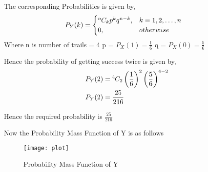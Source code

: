 \documentclass{beamer}
\providecommand{\brak}[1]{\ensuremath{\left(#1\right)}}
\theoremstyle{remark}
\newcommand*{\permcomb}[4][0mu]{{{}^{#3}\mkern#1#2_{#4}}}
\newcommand*{\comb}[1][-1mu]{\permcomb[#1]{C}}
\numberwithin{equation}{subsection}
\begin{document}
\begin{frame}{}
The corresponding Probabilities is given by,
\begin{align}
	P_Y(k) &= \begin{cases} \comb{n}{k} p^k q^{n-k} , & k = 1,2,\dots ,n \\
	0 , & otherwise \end{cases}
\end{align}
Where n is number of trails = 4\newline
p = $P_X(1) = \frac{1}{6}$ \newline
q = $P_X(0) = \frac{5}{6}$ \newline
\end{frame}

\begin{frame}
Hence the probability of getting success twice is given by,
\begin{align}
	P_Y(2) &= \comb{4}{2} \brak{\frac{1}{6}}^2 \brak{\frac{5}{6}}^{4-2} \\
	P_Y(2) &= \frac{25}{216}
\end{align}
\begin{block}{}
Hence the required probability is $\frac{25}{216}$
\end{block}
\end{frame}
\begin{frame}
	Now the Probability Mass Function of Y is as follows
\begin{figure}[h]
	\texttt{[image: plot]}
	\label{fig:mesh}
	\caption{Probability Mass Function of Y}
\end{figure}
\end{frame}
\end{document}
